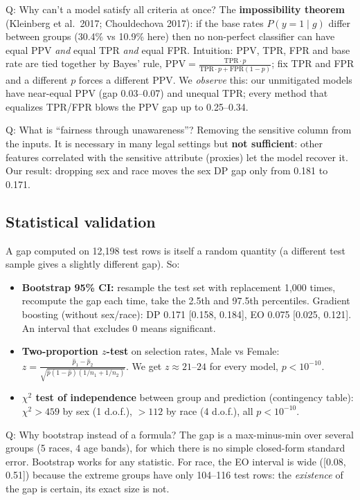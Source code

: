 \documentclass[11pt,a4paper]{article}
\begin{document}
\begin{qa}{Q: Why can't a model satisfy all criteria at once?}
The \textbf{impossibility theorem} (Kleinberg et al.\ 2017; Chouldechova 2017): if the base rates $P(y=1\mid g)$ differ between groups (30.4\% vs 10.9\% here) then no non-perfect classifier can have equal PPV \emph{and} equal TPR \emph{and} equal FPR. Intuition: PPV, TPR, FPR and base rate are tied together by Bayes' rule, $\mathrm{PPV}=\frac{\mathrm{TPR}\cdot p}{\mathrm{TPR}\cdot p+\mathrm{FPR}(1-p)}$; fix TPR and FPR and a different $p$ forces a different PPV. We \emph{observe} this: our unmitigated models have near-equal PPV (gap 0.03--0.07) and unequal TPR; every method that equalizes TPR/FPR blows the PPV gap up to 0.25--0.34.
\end{qa}

\begin{qa}{Q: What is ``fairness through unawareness''?}
Removing the sensitive column from the inputs. It is necessary in many legal settings but \textbf{not sufficient}: other features correlated with the sensitive attribute (proxies) let the model recover it. Our result: dropping sex and race moves the sex DP gap only from 0.181 to 0.171.
\end{qa}

\subsection{Statistical validation}
A gap computed on 12,198 test rows is itself a random quantity (a different test sample gives a slightly different gap). So:
\begin{itemize}
  \item \textbf{Bootstrap 95\% CI:} resample the test set with replacement 1,000 times, recompute the gap each time, take the 2.5th and 97.5th percentiles. Gradient boosting (without sex/race): DP 0.171 [0.158, 0.184], EO 0.075 [0.025, 0.121]. An interval that excludes 0 means significant.
  \item \textbf{Two-proportion $z$-test} on selection rates, Male vs Female: $z=\frac{\hat p_1-\hat p_2}{\sqrt{\hat p(1-\hat p)(1/n_1+1/n_2)}}$. We get $z\approx 21$--$24$ for every model, $p<10^{-10}$.
  \item \textbf{$\chi^2$ test of independence} between group and prediction (contingency table): $\chi^2>459$ by sex (1 d.o.f.), $>112$ by race (4 d.o.f.), all $p<10^{-10}$.
\end{itemize}

\begin{qa}{Q: Why bootstrap instead of a formula?}
The gap is a max-minus-min over several groups (5 races, 4 age bands), for which there is no simple closed-form standard error. Bootstrap works for any statistic. For race, the EO interval is wide ([0.08, 0.51]) because the extreme groups have only 104--116 test rows: the \emph{existence} of the gap is certain, its exact size is not.
\end{qa}
\end{document}
